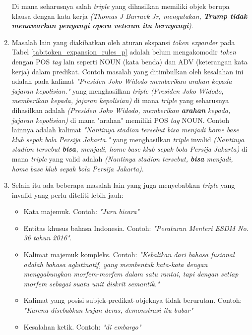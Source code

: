 \begin{enumerate}
	Di mana seharusnya salah \textit{triple} yang dihasilkan memiliki objek berupa klausa dengan kata kerja \textit{(Thomas J Barrack Jr, mengatakan, \textbf{Trump tidak menawarkan penyanyi opera veteran itu bernyanyi})}. 
	
	\item Masalah lain yang diakibatkan oleh aturan ekspansi \textit{token expander} pada Tabel \ref{tab:token_expansion_rules_p} adalah belum mengakomodir \textit{token} dengan POS \textit{tag} lain seperti NOUN (kata benda) dan ADV (keterangan kata kerja) dalam predikat. Contoh masalah yang ditimbulkan oleh kesalahan ini adalah pada kalimat \textit{"Presiden Joko Widodo memberikan arahan kepada jajaran kepolisian."} yang menghasilkan \textit{triple} \textit{(Presiden Joko Widodo, memberikan kepada, jajaran kepolisian)} di mana \textit{triple} yang seharusnya dihasilkan adalah \textit{(Presiden Joko Widodo, memberikan \textbf{arahan} kepada, jajaran kepolisian)} di mana "arahan" memiliki POS \textit{tag} NOUN. Contoh lainnya adalah kalimat \textit{"Nantinya stadion tersebut bisa menjadi home base klub sepak bola Persija Jakarta."} yang menghasilkan \textit{triple} invalid \textit{(Nantinya stadion tersebut \textbf{bisa}, menjadi, home base klub sepak bola Persija Jakarta)} di mana \textit{triple} yang valid adalah \textit{(Nantinya stadion tersebut, \textbf{bisa} menjadi, home base klub sepak bola Persija Jakarta)}.
	
	\item Selain itu ada beberapa masalah lain yang juga menyebabkan \textit{triple} yang invalid yang perlu diteliti lebih jauh:
	
	\begin{itemize}
	\item Kata majemuk. Contoh: \textit{"Juru bicara"}
	\item Entitas khusus bahasa Indonesia. Contoh: \textit{"Peraturan Menteri ESDM No. 36 tahun 2016"}.
	\item Kalimat majemuk kompleks. Contoh: \textit{"Kebalikan dari bahasa fusional adalah bahasa aglutinatif, yang membentuk kata-kata dengan menggabungkan morfem-morfem dalam satu rantai, tapi dengan setiap morfem sebagai suatu unit diskrit semantik."}
	\item Kalimat yang posisi subjek-predikat-objeknya tidak berurutan. Contoh: \textit{"Karena disebabkan hujan deras, demonstrasi itu bubar"}
	\item Kesalahan ketik. Contoh: \textit{"di embargo"}
	\end{itemize}
	
\end{enumerate} 

